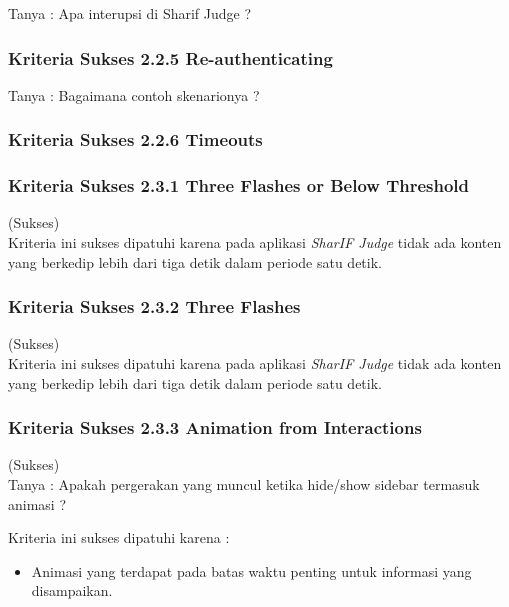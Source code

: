 Tanya : Apa interupsi di Sharif Judge ?

\subsubsection{Kriteria Sukses 2.2.5 Re-authenticating}
\label{subsubsec:kepatuhan_kriteria_2.2.5}

Tanya : Bagaimana contoh skenarionya ?

\subsubsection{Kriteria Sukses 2.2.6 Timeouts}
\label{subsubsec:kepatuhan_kriteria_2.2.6}

\subsubsection{Kriteria Sukses 2.3.1 Three Flashes or Below Threshold}
\label{subsubsec:kepatuhan_kriteria_2.3.1}
(Sukses)\\

Kriteria ini sukses dipatuhi karena pada aplikasi \textit{SharIF Judge} tidak ada konten yang berkedip lebih dari tiga detik dalam periode satu detik.

\subsubsection{Kriteria Sukses 2.3.2 Three Flashes}
\label{subsubsec:kepatuhan_kriteria_2.3.2}
(Sukses) \\

Kriteria ini sukses dipatuhi karena pada aplikasi \textit{SharIF Judge} tidak ada konten yang berkedip lebih dari tiga detik dalam periode satu detik.

\subsubsection{Kriteria Sukses 2.3.3 Animation from Interactions}
\label{subsubsec:kepatuhan_kriteria_2.3.3}
(Sukses) \\

Tanya : Apakah pergerakan yang muncul ketika hide/show sidebar termasuk animasi ?

Kriteria ini sukses dipatuhi karena :
\begin{itemize}
	\item Animasi yang terdapat pada batas waktu penting untuk informasi yang disampaikan.
\end{itemize}

